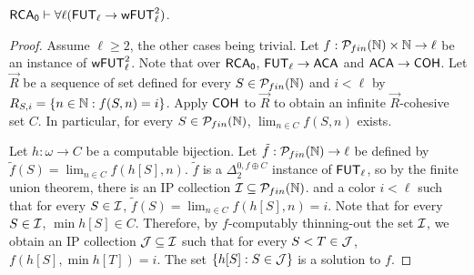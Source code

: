 \begin{theorem}
$\operatorname{\sf{RCA}_0} \vdash \forall \ell(\operatorname{\sf{FUT}}_\ell \to \operatorname{\sf{wFUT}}^2_\ell)$.
\end{theorem}
\begin{proof}
Assume $\ell \geq 2$, the other cases being trivial.
Let $f : \mathcal{P}_{fin}(\mathbb{N}) \times \mathbb{N} \to \ell$ be an instance of $\operatorname{\sf{wFUT}}^2_\ell$.
Note that over $\operatorname{\sf{RCA}_0}$, $\operatorname{\sf{FUT}}_\ell \rightarrow \operatorname{\sf{ACA}}$ and $\operatorname{\sf{ACA}} \rightarrow \operatorname{\sf{COH}}$.
Let $\vec{R}$ be a sequence of set defined for every $S \in \mathcal{P}_{fin}(\mathbb{N})$ and $i < \ell$
by $R_{S,i} = \{ n \in \mathbb{N} : f(S, n) = i \}$.
Apply $\operatorname{\sf{COH}}$ to $\vec{R}$ to obtain an infinite $\vec{R}$-cohesive set $C$.
In particular, for every $S \in \mathcal{P}_{fin}(\mathbb{N})$, $\lim_{n \in C} f(S, n)$ exists.

Let $h : \omega \to C$ be a computable bijection.
Let $\tilde{f} : \mathcal{P}_{fin}(\mathbb{N}) \to \ell$ be defined by $\tilde{f}(S) = \lim_{n \in C} f(h[S], n)$.
$\tilde{f}$ is a $\Delta^{0,f \oplus C}_2$ instance of $\operatorname{\sf{FUT}}_\ell$, so by the finite union theorem, there is an IP collection $\mathcal{I} \subseteq \mathcal{P}_{fin}(\mathbb{N})$.
and a color $i < \ell$ such that 
for every $S \in \mathcal{I}$, $\tilde{f}(S) = \lim_{n \in C} f(h[S], n) = i$. Note that for every $S \in \mathcal{I}$, $\min h[S] \in C$.
Therefore, by $f$-computably 
thinning-out the set $\mathcal{I}$, we obtain an IP collection $\mathcal{J} \subseteq \mathcal{I}$
such that for every $S < T \in \mathcal{J}$, $f(h[S], \min h[T]) = i$.
The set $\{h[S] : S \in \mathcal{J}\}$ is a solution to $f$.
%
\end{proof}

